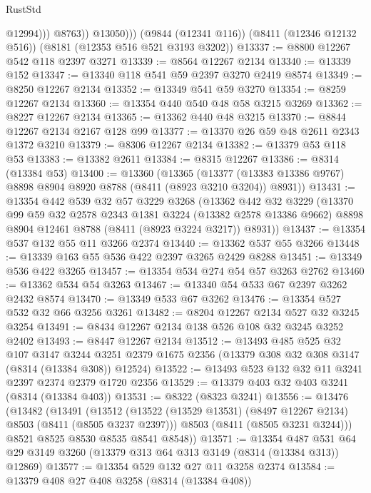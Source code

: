 \begin{lexlean}{RustStd}
\begin{coremodule}
                    @12994)))
              @8763))
          @13050)))
    (@9844 (@12341 @116))
    (@8411 (@12346 @12132 @516))
    (@8181 (@12353 @516 @521 @3193 @3202))
@13337 := @8800 @12267 @542 @118 @2397 @3271
@13339 := @8564 @12267 @2134
@13340 := @13339 @152
@13347 := @13340 @118 @541 @59 @2397 @3270 @2419 @8574
@13349 := @8250 @12267 @2134
@13352 := @13349 @541 @59 @3270
@13354 := @8259 @12267 @2134
@13360 := @13354 @440 @540 @48 @58 @3215 @3269
@13362 := @8227 @12267 @2134
@13365 := @13362 @440 @48 @3215
@13370 := @8844 @12267 @2134 @2167 @128 @99
@13377 := @13370 @26 @59 @48 @2611 @2343 @1372 @3210
@13379 := @8306 @12267 @2134
@13382 := @13379 @53 @118 @53
@13383 := @13382 @2611
@13384 := @8315 @12267
@13386 := @8314 (@13384 @53)
@13400 := @13360
    (@13365
      (@13377 (@13383 @13386 @9767) @8898 @8904 @8920 @8788 (@8411 (@8923 @3210 @3204)) @8931))
@13431 := @13354
    @442
    @539
    @32
    @57
    @3229
    @3268
    (@13362
      @442
      @32
      @3229
      (@13370
        @99
        @59
        @32
        @2578
        @2343
        @1381
        @3224
        (@13382 @2578 @13386 @9662)
        @8898
        @8904
        @12461
        @8788
        (@8411 (@8923 @3224 @3217))
        @8931))
@13437 := @13354 @537 @132 @55 @11 @3266 @2374
@13440 := @13362 @537 @55 @3266
@13448 := @13339 @163 @55 @536 @422 @2397 @3265 @2429 @8288
@13451 := @13349 @536 @422 @3265
@13457 := @13354 @534 @274 @54 @57 @3263 @2762
@13460 := @13362 @534 @54 @3263
@13467 := @13340 @54 @533 @67 @2397 @3262 @2432 @8574
@13470 := @13349 @533 @67 @3262
@13476 := @13354 @527 @532 @32 @66 @3256 @3261
@13482 := @8204 @12267 @2134 @527 @32 @3245 @3254
@13491 := @8434 @12267 @2134 @138 @526 @108 @32 @3245 @3252 @2402
@13493 := @8447 @12267 @2134
@13512 := @13493
    @485
    @525
    @32
    @107
    @3147
    @3244
    @3251
    @2379
    @1675
    @2356
    (@13379 @308 @32 @308 @3147 (@8314 (@13384 @308)) @12524)
@13522 := @13493 @523 @132 @32 @11 @3241 @2397 @2374 @2379 @1720 @2356
@13529 := @13379 @403 @32 @403 @3241 (@8314 (@13384 @403))
@13531 := @8322 (@8323 @3241)
@13556 := @13476
    (@13482
      (@13491
        (@13512
          (@13522 (@13529 @13531) (@8497 @12267 @2134) @8503 (@8411 (@8505 @3237 @2397)))
          @8503
          (@8411 (@8505 @3231 @3244)))
        @8521
        @8525
        @8530
        @8535
        @8541
        @8548))
@13571 := @13354
    @487
    @531
    @64
    @29
    @3149
    @3260
    (@13379 @313 @64 @313 @3149 (@8314 (@13384 @313)) @12869)
@13577 := @13354 @529 @132 @27 @11 @3258 @2374
@13584 := @13379 @408 @27 @408 @3258 (@8314 (@13384 @408))

\end{coremodule}
\end{lexlean}
